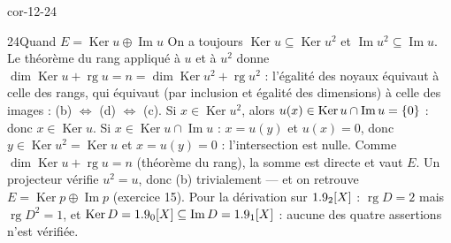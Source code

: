 \begin{blocLivre}{cor-12-24}
\begin{corrige}{24}{Quand $E=\operatorname{Ker}u\oplus\operatorname{Im}u$}
On a toujours $\operatorname{Ker}u\subseteq\operatorname{Ker}u^{2}$ et
$\operatorname{Im}u^{2}\subseteq\operatorname{Im}u$. Le théorème du rang
appliqué à $u$ et à $u^{2}$ donne
$\dim\operatorname{Ker}u+\operatorname{rg}u=n
=\dim\operatorname{Ker}u^{2}+\operatorname{rg}u^{2}$ : l'égalité des noyaux
équivaut à celle des rangs, qui équivaut (par inclusion et égalité des
dimensions) à celle des images : (b) $\iff$ (d) $\iff$ (c).
Si $x\in\operatorname{Ker}u^{2}$, alors
$u(x)\in\operatorname{Ker}u\cap\operatorname{Im}u=\left\{0\right\}$ : donc
$x\in\operatorname{Ker}u$.
Si $x\in\operatorname{Ker}u\cap\operatorname{Im}u$ : $x=u(y)$ et
$u(x)=0$, donc $y\in\operatorname{Ker}u^{2}=\operatorname{Ker}u$ et
$x=u(y)=0$ : l'intersection est nulle. Comme
$\dim\operatorname{Ker}u+\operatorname{rg}u=n$ (théorème du rang), la somme
est directe et vaut $E$.
Un projecteur vérifie $u^{2}=u$, donc (b) trivialement — et on retrouve
$E=\operatorname{Ker}p\oplus\operatorname{Im}p$ (exercice 15). Pour la
dérivation sur $1.9_2[X]$ : $\operatorname{rg}D=2$ mais
$\operatorname{rg}D^{2}=1$, et
$\operatorname{Ker}D=1.9_0[X]\subseteq\operatorname{Im}D=1.9_1[X]$ : aucune
des quatre assertions n'est vérifiée.
\end{corrige}
\end{blocLivre}


